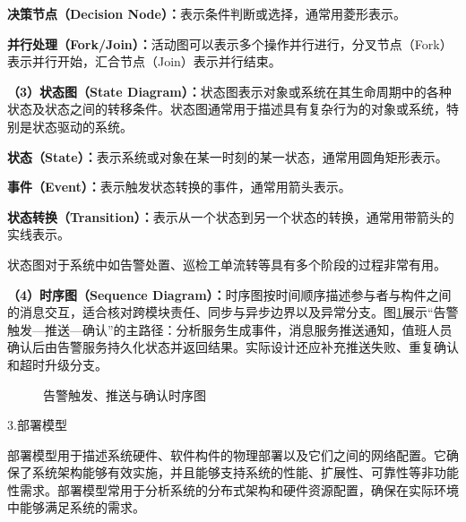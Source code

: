 \textbf{决策节点（Decision Node）：}表示条件判断或选择，通常用菱形表示。

\textbf{并行处理（Fork/Join）：}活动图可以表示多个操作并行进行，分叉节点（Fork）表示并行开始，汇合节点（Join）表示并行结束。

\textbf{（3）状态图（State Diagram）：}状态图表示对象或系统在其生命周期中的各种状态及状态之间的转移条件。状态图通常用于描述具有复杂行为的对象或系统，特别是状态驱动的系统。

\textbf{状态（State）：}表示系统或对象在某一时刻的某一状态，通常用圆角矩形表示。

\textbf{事件（Event）：}表示触发状态转换的事件，通常用箭头表示。

\textbf{状态转换（Transition）：}表示从一个状态到另一个状态的转换，通常用带箭头的实线表示。

状态图对于系统中如告警处置、巡检工单流转等具有多个阶段的过程非常有用。

\textbf{（4）时序图（Sequence Diagram）：}时序图按时间顺序描述参与者与构件之间的消息交互，适合核对跨模块责任、同步与异步边界以及异常分支。图\ref{fig:uml-sequence}展示“告警触发—推送—确认”的主路径：分析服务生成事件，消息服务推送通知，值班人员确认后由告警服务持久化状态并返回结果。实际设计还应补充推送失败、重复确认和超时升级分支。

\begin{figure}[htbp]
\centering
{}
\caption{告警触发、推送与确认时序图}
\label{fig:uml-sequence}
\end{figure}

3.部署模型

部署模型用于描述系统硬件、软件构件的物理部署以及它们之间的网络配置。它确保了系统架构能够有效实施，并且能够支持系统的性能、扩展性、可靠性等非功能性需求。部署模型常用于分析系统的分布式架构和硬件资源配置，确保在实际环境中能够满足系统的需求。


